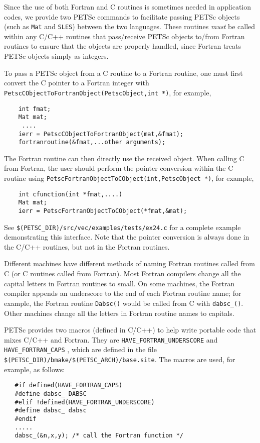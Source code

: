 Since the use of both Fortran and C routines is sometimes needed in
application codes, we provide two PETSc commands to facilitate passing
PETSc objects (such as {\tt Mat} and {\tt SLES}) between the two
languages.  These routines {\em must} be called within any C/C++
routines that pass/receive PETSc objects to/from Fortran routines to
ensure that the objects are properly handled, since Fortran treats PETSc
objects simply as integers.

To pass a PETSc object from a C routine to a Fortran routine, one must
first convert the C pointer to a Fortran integer with {\tt
PetscCObjectToFortranObject(PetscObject,int *)}, for example,
\begin{verbatim}
    int fmat;
    Mat mat;
     ....
    ierr = PetscCObjectToFortranObject(mat,&fmat);
    fortranroutine(&fmat,...other arguments);
\end{verbatim}
The Fortran routine can then directly use the received object.
When calling C from Fortran, the user should perform the 
pointer conversion within the C routine using
{\tt PetscFortranObjectToCObject(int,PetscObject *)}, for example,
\begin{verbatim}
    int cfunction(int *fmat,....)
    Mat mat;
    ierr = PetscFortranObjectToCObject(*fmat,&mat);
\end{verbatim}
See {\tt \$(PETSC\_DIR)/src/vec/examples/tests/ex24.c} for a complete
example demonstrating this interface.  Note that the pointer
conversion is always done in the C/C++ routines, but not
in the Fortran routines.

Different machines have
different methods of naming Fortran routines called from C 
(or C routines called from Fortran). Most Fortran compilers change
all the capital letters in Fortran routines to small. On some machines, the 
Fortran compiler appends an underscore to the end of each Fortran 
routine name; for example, the Fortran routine {\tt Dabsc()}
would be called from C with {\tt dabsc\_()}.  Other machines
change all the letters in Fortran routine names to capitals. 

PETSc provides two macros (defined in C/C++) to help write 
portable code that mixes C/C++ and Fortran. They are 
{\tt HAVE\_FORTRAN\_UNDERSCORE} and {\tt HAVE\_FORTRAN\_CAPS}
 ,
which are defined in the file {\tt \$(PETSC\_DIR)/bmake/\$(PETSC\_ARCH)/base.site}.
The macros are used, for example, as follows:
\begin{verbatim}
   #if defined(HAVE_FORTRAN_CAPS)
   #define dabsc_ DABSC
   #elif !defined(HAVE_FORTRAN_UNDERSCORE)
   #define dabsc_ dabsc
   #endif
   .....
   dabsc_(&n,x,y); /* call the Fortran function */
\end{verbatim}

